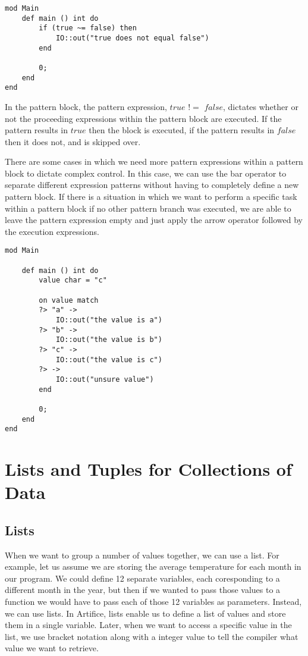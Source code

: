 \documentclass{article}
\begin{document}
\begin{lstlisting}
mod Main
	def main () int do
		if (true ~= false) then
			IO::out("true does not equal false")
		end
	
		0;
	end
end
\end{lstlisting}

In the pattern block, the pattern expression, $true$ $!=$ $false$, dictates whether or not the proceeding expressions within the pattern block are executed. If the pattern
results in $true$ then the block is executed, if the pattern results in $false$ then it does not, and is skipped over.

There are some cases in which we need more pattern expressions within a pattern block to dictate complex control. In this case, we can use the bar operator to separate different
expression patterns without having to completely define a new pattern block. If there is a situation in which we want to perform a specific task within a pattern block if no other
pattern branch was executed, we are able to leave the pattern expression empty and just apply the arrow operator followed by the execution expressions.

\begin{lstlisting}
mod Main

	def main () int do
		value char = "c"

		on value match
		?> "a" ->
			IO::out("the value is a")
		?> "b" ->
			IO::out("the value is b")
		?> "c" ->
			IO::out("the value is c")
		?> ->
			IO::out("unsure value")
		end

		0;
	end
end
\end{lstlisting}


\section{Lists and Tuples for Collections of Data}

\subsection{Lists}

When we want to group a number of values together, we can use a list. For example, let us assume we are storing the average temperature for each month in our program.
We could define 12 separate variables, each coresponding to a different month in the year, but then if we wanted to pass those values to a function we would have to pass
each of those 12 variables as parameters. Instead, we can use lists. In Artifice, lists enable us to define a list of values and store them in a single variable.
Later, when we want to access a specific value in the list, we use bracket notation along with a integer value to tell the compiler what value we want to retrieve.
\end{document}
